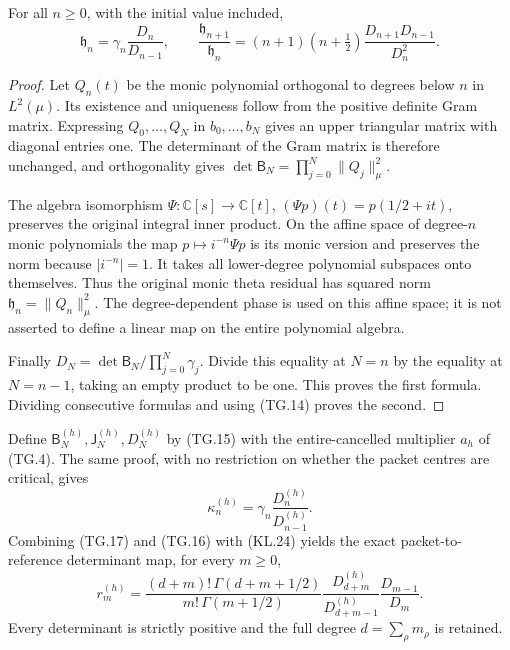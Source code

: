 \begin{theorem}
For all \(n\geq0\), with the initial value included,
\[
 \boxed{\mathfrak h_n=\gamma_n\frac{D_n}{D_{n-1}},\qquad
 \frac{\mathfrak h_{n+1}}{\mathfrak h_n}
   =(n+1)(n+\tfrac12)\frac{D_{n+1}D_{n-1}}{D_n^2}.}
                                                               \tag{TG.16}
\]
\end{theorem}
\begin{proof}
Let \(Q_n(t)\) be the monic polynomial orthogonal to degrees below
\(n\) in \(L^2(\mu)\).  Its existence and uniqueness follow
from the positive definite Gram matrix.  Expressing
\(Q_0,\ldots,Q_N\) in \(b_0,\ldots,b_N\) gives an upper
triangular matrix with diagonal entries one.  The determinant of
the Gram matrix is therefore unchanged, and orthogonality gives
\(\det\mathsf B_N=\prod_{j=0}^N\|Q_j\|_\mu^2\).

The algebra isomorphism
\(\Psi:\mathbb{C}[s]\to\mathbb{C}[t]\),
\((\Psi p)(t)=p(1/2+it)\), preserves the original integral
inner product.  On the affine space of degree-\(n\) monic
polynomials the map \(p\mapsto i^{-n}\Psi p\) is its monic
version and preserves the norm because \(|i^{-n}|=1\).
It takes all lower-degree polynomial subspaces onto themselves.
Thus the original monic theta residual has squared norm
\(\mathfrak h_n=\|Q_n\|_\mu^2\).  The degree-dependent phase
is used on this affine space; it is not asserted to define a linear
map on the entire polynomial algebra.

Finally \(D_N=\det\mathsf B_N/\prod_{j=0}^N\gamma_j\).
Divide this equality at \(N=n\) by the equality at \(N=n-1\),
taking an empty product to be one.  This proves the first formula.
Dividing consecutive formulas and using (TG.14) proves the second.
\end{proof}

Define \(\mathsf B_N^{(h)},\mathsf J_N^{(h)},D_N^{(h)}\)
by (TG.15) with the entire-cancelled multiplier \(a_h\) of
(TG.4).  The same proof, with no restriction on whether the packet
centres are critical, gives
\[
 \kappa_n^{(h)}=\gamma_n\frac{D_n^{(h)}}{D_{n-1}^{(h)}}.
                                                               \tag{TG.17}
\]
Combining (TG.17) and (TG.16) with (KL.24) yields the exact
packet-to-reference determinant map, for every \(m\geq0\),
\[
 \boxed{r_m^{(h)}=
  \frac{(d+m)!\,\Gamma(d+m+1/2)}{m!\,\Gamma(m+1/2)}
  \frac{D_{d+m}^{(h)}}{D_{d+m-1}^{(h)}}
  \frac{D_{m-1}}{D_m}.}
                                                               \tag{TG.18}
\]
Every determinant is strictly positive and the full degree
\(d=\sum_\rho m_\rho\) is retained.

